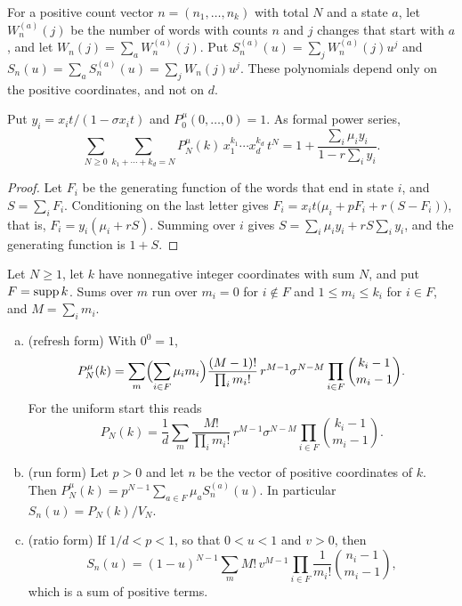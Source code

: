 For a positive count vector $n=(n_1,\ldots,n_k)$ with total $N$ and a state $a$,
let $W^{(a)}_n(j)$ be the number of words with counts $n$ and $j$ changes that
start with $a$, and let $W_n(j)=\sum_aW^{(a)}_n(j)$. Put
$S^{(a)}_n(u)=\sum_jW^{(a)}_n(j)u^j$ and $S_n(u)=\sum_aS^{(a)}_n(u)=\sum_jW_n(j)u^j$.
These polynomials depend only on the positive coordinates, and not on $d$.

\begin{proposition}\label{prop:dgf}
Put $y_i=x_it/(1-\sigma x_it)$ and $P^\mu_0(0,\ldots,0)=1$. As formal power
series,
\[
\sum_{N\ge0}\sum_{k_1+\cdots+k_d=N}P^\mu_N(k)\,x_1^{k_1}\cdots x_d^{k_d}\,t^N
=1+\frac{\sum_i\mu_iy_i}{1-r\sum_iy_i}.
\]
\end{proposition}

\begin{proof}
Let $F_i$ be the generating function of the words that end in state $i$, and
$S=\sum_iF_i$. Conditioning on the last letter gives
$F_i=x_it\bigl(\mu_i+pF_i+r(S-F_i)\bigr)$, that is, $F_i=y_i(\mu_i+rS)$. Summing
over $i$ gives $S=\sum_i\mu_iy_i+rS\sum_iy_i$, and the generating function is
$1+S$.
\end{proof}

\begin{proposition}\label{prop:dpmf}
Let $N\ge1$, let $k$ have nonnegative integer coordinates with sum $N$, and put
$F=\operatorname{supp} k$. Sums over $m$ run over $m_i=0$ for $i\notin F$ and $1\le m_i\le k_i$
for $i\in F$, and $M=\sum_im_i$.
\begin{enumerate}[(a)]
\item (refresh form) With $0^0=1$,
\[
P^\mu_N(k)=\sum_m\Bigl(\sum_{i\in F}\mu_im_i\Bigr)\frac{(M-1)!}{\prod_im_i!}\,
r^{M-1}\sigma^{N-M}\prod_{i\in F}\binom{k_i-1}{m_i-1}.
\]
For the uniform start this reads
\[
P_N(k)=\frac1d\sum_m\frac{M!}{\prod_im_i!}\,
r^{M-1}\sigma^{N-M}\prod_{i\in F}\binom{k_i-1}{m_i-1}.
\]
\item (run form) Let $p>0$ and let $n$ be the vector of positive coordinates of
$k$. Then $P^\mu_N(k)=p^{N-1}\sum_{a\in F}\mu_aS^{(a)}_n(u)$. In particular
$S_n(u)=P_N(k)/V_N$.
\item (ratio form) If $1/d<p<1$, so that $0<u<1$ and $v>0$, then
\begin{equation}\label{eq:simplex-positive-sum}
S_n(u)=(1-u)^{N-1}\sum_mM!\,v^{M-1}\prod_{i\in F}\frac1{m_i!}\binom{n_i-1}{m_i-1},
\end{equation}
which is a sum of positive terms.
\end{enumerate}
\end{proposition}

